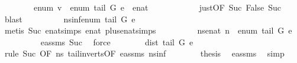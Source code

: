 \begin{isabellebody}
\ \ \ \ \ \ \ \ {\isachardoublequoteopen}enum\ v\ {\isacharequal}\ enum\ {\isacharparenleft}tail\ G\ e{\isacharparenright}\ {\isacharplus}\ enat\ {}{\isachardoublequoteclose}\ \isanewline
\ \ \ \ \ \ \ \ \isamarkupfalse%
\ just{\isacharbrackleft}OF\ Suc{\isacharparenleft}{}{\isacharparenright}\ False\ Suc{\isacharparenleft}{}{\isacharparenright}{\isacharbrackright}\ \isamarkupfalse%
\ blast\isanewline
\ \ \ \ \ \ \isamarkupfalse%
\ \isamarkupfalse%
\ nsinf{\isacharcolon}{\isachardoublequoteopen}enum\ {\isacharparenleft}tail\ G\ e{\isacharparenright}\ {\isasymnoteq}\ {\isasyminfinity}{\isachardoublequoteclose}\ \isanewline
\ \ \ \ \ \ \ \ \isamarkupfalse%
\ {\isacharparenleft}metis\ Suc{\isacharparenleft}{}{\isacharparenright}\ enat{\isachardot}simps{\isacharparenleft}{}{\isacharparenright}\ enat{\isacharunderscore}{}\ plus{\isacharunderscore}enat{\isacharunderscore}simps{\isacharparenleft}{}{\isacharparenright}{\isacharparenright}\isanewline
\ \ \ \ \ \ \isamarkupfalse%
\ \isamarkupfalse%
\ ns{\isacharcolon}{\isachardoublequoteopen}enat\ n\ {\isacharequal}\ enum\ {\isacharparenleft}tail\ G\ e{\isacharparenright}{\isachardoublequoteclose}\ \isanewline
\ \ \ \ \ \ \ \ \isamarkupfalse%
\ e{\isacharunderscore}assms{\isacharparenleft}{}{\isacharparenright}\ Suc{\isacharparenleft}{}{\isacharparenright}\ \isamarkupfalse%
\ force\isanewline
\ \ \ \ \ \ \isamarkupfalse%
\ {\isachardoublequoteopen}dist\ {\isacharparenleft}tail\ G\ e\ {\isacharparenright}\ {\isasymnoteq}\ {\isacharminus}\ {\isasyminfinity}{\isachardoublequoteclose}\ \isanewline
\ \ \ \ \ \ \ \ \isamarkupfalse%
\ {\isacharparenleft}rule\ Suc{\isacharparenleft}{}{\isacharparenright}\ {\isacharbrackleft}OF\ ns\ tail{\isacharunderscore}in{\isacharunderscore}verts{\isacharbrackleft}OF\ e{\isacharunderscore}assms{\isacharparenleft}{}{\isacharparenright}{\isacharbrackright}\ nsinf{\isacharbrackright}{\isacharparenright}\isanewline
\ \ \ \ \ \ \isamarkupfalse%
\ {\isacharquery}thesis\ \isamarkupfalse%
\ e{\isacharunderscore}assms{\isacharparenleft}{}{\isacharparenright}\ \isamarkupfalse%
\ simp\isanewline
\ \ \ \ \isamarkupfalse%
\isanewline
\ \ \isamarkupfalse%
\isanewline
{}\isamarkupfalse%

\end{isabellebody}
